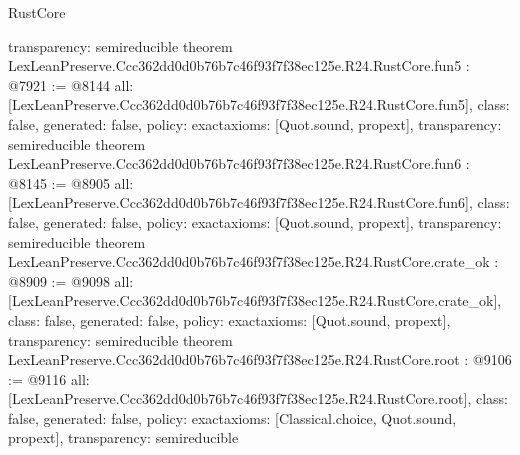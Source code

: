 \begin{lexlean}{RustCore}
\begin{coremodule}
{  transparency: semireducible
}
theorem LexLeanPreserve.Ccc362dd0d0b76b7c46f93f7f38ec125e.R24.RustCore.fun5 : @7921 := @8144 {
  all: [LexLeanPreserve.Ccc362dd0d0b76b7c46f93f7f38ec125e.R24.RustCore.fun5],
  class: false,
  generated: false,
  policy: exact{axioms: [Quot.sound, propext]},
  transparency: semireducible
}
theorem LexLeanPreserve.Ccc362dd0d0b76b7c46f93f7f38ec125e.R24.RustCore.fun6 : @8145 := @8905 {
  all: [LexLeanPreserve.Ccc362dd0d0b76b7c46f93f7f38ec125e.R24.RustCore.fun6],
  class: false,
  generated: false,
  policy: exact{axioms: [Quot.sound, propext]},
  transparency: semireducible
}
theorem LexLeanPreserve.Ccc362dd0d0b76b7c46f93f7f38ec125e.R24.RustCore.crate_ok : @8909 := @9098 {
  all: [LexLeanPreserve.Ccc362dd0d0b76b7c46f93f7f38ec125e.R24.RustCore.crate_ok],
  class: false,
  generated: false,
  policy: exact{axioms: [Quot.sound, propext]},
  transparency: semireducible
}
theorem LexLeanPreserve.Ccc362dd0d0b76b7c46f93f7f38ec125e.R24.RustCore.root : @9106 := @9116 {
  all: [LexLeanPreserve.Ccc362dd0d0b76b7c46f93f7f38ec125e.R24.RustCore.root],
  class: false,
  generated: false,
  policy: exact{axioms: [Classical.choice, Quot.sound, propext]},
  transparency: semireducible
}


\end{coremodule}
\end{lexlean}

